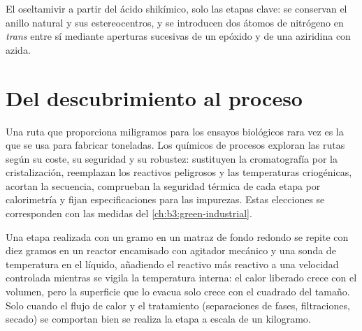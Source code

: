\begin{omfigure}

{\small El oseltamivir a partir del ácido shikímico, solo las etapas clave: se conservan el anillo natural y sus
estereocentros, y se introducen dos átomos de nitrógeno en \textit{trans} entre sí
mediante aperturas sucesivas de un epóxido y de una aziridina con azida.}
\end{omfigure}

\section{Del descubrimiento al proceso}

Una ruta que proporciona miligramos para los ensayos biológicos rara vez es la que se usa
para fabricar toneladas. Los químicos de procesos exploran las rutas según su coste, su seguridad y su robustez:
sustituyen la cromatografía por la cristalización, reemplazan los reactivos peligrosos
y las temperaturas criogénicas, acortan la secuencia, comprueban la seguridad
térmica de cada etapa por calorimetría y fijan especificaciones para las impurezas.
Estas elecciones se corresponden con las medidas del \cref{ch:b3:green-industrial}.

\begin{inthelab}
Una etapa realizada con un gramo en un matraz de fondo redondo se repite con diez gramos en un
reactor encamisado con agitador mecánico y una sonda de temperatura en el
líquido, añadiendo el reactivo más reactivo a una velocidad controlada mientras se vigila la
temperatura interna: el calor liberado crece con el volumen, pero la superficie que lo
evacua solo crece con el cuadrado del tamaño. Solo cuando el flujo de calor y el tratamiento
(separaciones de fases, filtraciones, secado) se comportan bien se realiza la etapa a escala de un kilogramo.
\end{inthelab}


